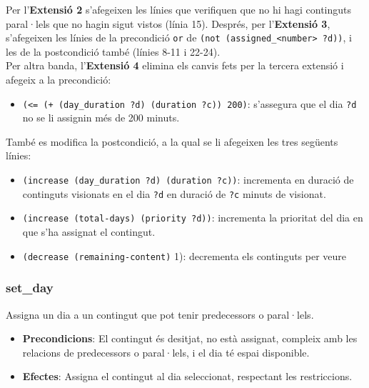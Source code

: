 \documentclass[a4paper]{article}
\begin{document}
	\noindent Per l'\textbf{Extensió 2} s'afegeixen les línies que verifiquen que no hi hagi continguts paral·lels que no hagin sigut vistos (línia 15). Després, per l'\textbf{Extensió 3}, s'afegeixen les línies de la precondició \texttt{or} de \texttt{(not (assigned\_<number> ?d))}, i les de la postcondició també (línies 8-11 i 22-24). \\
	
	\noindent Per altra banda, l'\textbf{Extensió 4} elimina els canvis fets per la tercera extensió i afegeix a la precondició:
	
	\begin{itemize}[label={}, leftmargin=1.5em, itemsep=0pt]
		\item \texttt{(<= (+ (day\_duration ?d) (duration ?c)) 200)}: s'assegura que el dia \texttt{?d} no se li assignin més de 200 minuts. \\
	\end{itemize}
	
	\noindent També es modifica la postcondició, a la qual se li afegeixen les tres següents línies:
	
	\begin{itemize}[label={}, leftmargin=1.5em, itemsep=0pt]
		\item \texttt{(increase (day\_duration ?d) (duration ?c))}: incrementa en duració de continguts visionats en el dia \texttt{?d} en duració de \texttt{?c} minuts de visionat.
		
		\item \texttt{(increase (total-days) (priority ?d))}: incrementa la prioritat del dia en que s'ha assignat el contingut.
		
		\item \texttt{(decrease (remaining-content)} 1): decrementa els continguts per veure
	\end{itemize}
	
	\subsubsection*{set\_day}
	Assigna un dia a un contingut que pot tenir predecessors o paral·lels.
	
	\begin{itemize}
		\item \textbf{Precondicions}: El contingut és desitjat, no està assignat, compleix amb les relacions de predecessors o paral·lels, i el dia té espai disponible.
		\item \textbf{Efectes}: Assigna el contingut al dia seleccionat, respectant les restriccions.
	\end{itemize}
	
\end{document}

